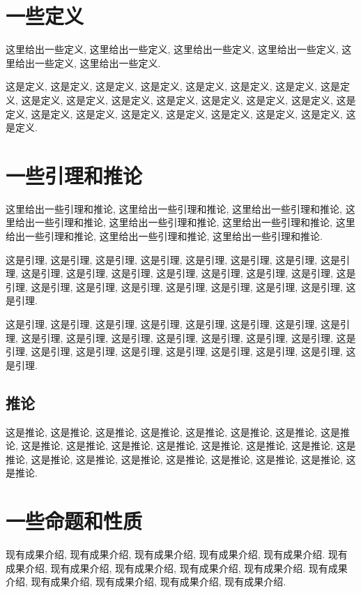 \documentclass[UTF8,openright]{ctexbook}
\begin{document}
\section{一些定义}
这里给出一些定义, 这里给出一些定义, 这里给出一些定义,
这里给出一些定义, 这里给出一些定义, 这里给出一些定义.

\begin{definition}
  这是定义, 这是定义, 这是定义, 这是定义, 这是定义, 这是定义,
  这是定义, 这是定义, 这是定义, 这是定义, 这是定义, 这是定义,
  这是定义, 这是定义, 这是定义, 这是定义, 这是定义, 这是定义,
  这是定义, 这是定义, 这是定义, 这是定义, 这是定义, 这是定义.
\end{definition}

\section{一些引理和推论}

这里给出一些引理和推论, 这里给出一些引理和推论, 这里给出一些引理和推论,
这里给出一些引理和推论, 这里给出一些引理和推论, 这里给出一些引理和推论,
这里给出一些引理和推论, 这里给出一些引理和推论, 这里给出一些引理和推论.

\begin{lemma}
  这是引理, 这是引理, 这是引理, 这是引理, 这是引理, 这是引理,
  这是引理, 这是引理, 这是引理, 这是引理, 这是引理, 这是引理,
  这是引理, 这是引理, 这是引理, 这是引理, 这是引理, 这是引理,
  这是引理, 这是引理, 这是引理, 这是引理, 这是引理, 这是引理.
\end{lemma}

\begin{lemma}
  这是引理, 这是引理, 这是引理, 这是引理, 这是引理, 这是引理,
  这是引理, 这是引理, 这是引理, 这是引理, 这是引理, 这是引理,
  这是引理, 这是引理, 这是引理, 这是引理, 这是引理, 这是引理,
  这是引理, 这是引理, 这是引理, 这是引理, 这是引理, 这是引理.
\end{lemma}

\subsection{推论}
\begin{corollary}
  这是推论, 这是推论, 这是推论, 这是推论, 这是推论, 这是推论,
  这是推论, 这是推论, 这是推论, 这是推论, 这是推论, 这是推论,
  这是推论, 这是推论, 这是推论, 这是推论, 这是推论, 这是推论,
  这是推论, 这是推论, 这是推论, 这是推论, 这是推论, 这是推论.
\end{corollary}

\section{一些命题和性质}
现有成果介绍, 现有成果介绍, 现有成果介绍, 现有成果介绍, 现有成果介绍.
现有成果介绍, 现有成果介绍, 现有成果介绍, 现有成果介绍, 现有成果介绍.
现有成果介绍, 现有成果介绍, 现有成果介绍, 现有成果介绍, 现有成果介绍.
\end{document}
